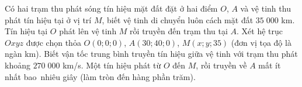 \begin{bt}%
	Có hai trạm thu phát sóng tín hiệu mặt đất đặt ở hai điểm $O$, $A$ và vệ tinh thu phát tín hiệu tại ở vị trí $M$, biết vệ tinh di chuyển luôn cách mặt đất $35\;000$ km. Tín hiệu tại $O$ phát lên vệ tinh $M$ rồi truyền đến trạm thu tại $A$. Xét hệ trục $Oxyz$ được chọn thỏa $O(0;0;0)$, $A(30; 40; 0)$, $M(x;y;35)$ (đơn vị tọa độ là ngàn km). Biết vận tốc  trung bình truyền tín hiệu giữa vệ tinh với trạm thu phát khoảng $270\;000$ km/s. Một tín hiệu phát từ $O$ đến $M$, rồi truyền về $A$ mất ít nhất bao~nhiêu giây (làm tròn đến hàng phần trăm).
\end{bt}

